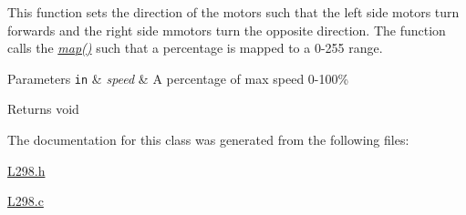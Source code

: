 This function sets the direction of the motors such that the left side motors turn forwards and the right side mmotors turn the opposite direction. The function calls the {\itshape \hyperlink{classL298_a937f021c405806051271c7ca4ab81fe2}{map()}} such that a percentage is mapped to a 0-\/255 range. 
\begin{DoxyParams}[1]{Parameters}
\mbox{\tt in}  & {\em speed} & A percentage of max speed 0-\/100\% \\
\hline
\end{DoxyParams}
\begin{DoxyReturn}{Returns}
void 
\end{DoxyReturn}


The documentation for this class was generated from the following files\+:\begin{DoxyCompactItemize}
\item 
\hyperlink{L298_8h}{L298.\+h}\item 
\hyperlink{L298_8c}{L298.\+c}\end{DoxyCompactItemize}
